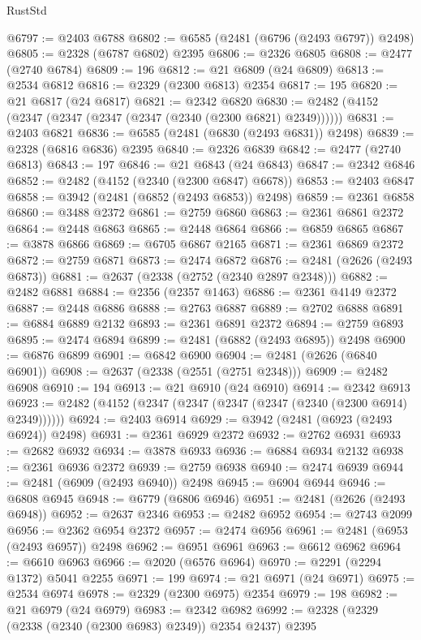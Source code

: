 \begin{lexlean}{RustStd}
\begin{coremodule}
@6797 := @2403 @6788
@6802 := @6585 (@2481 (@6796 (@2493 @6797)) @2498)
@6805 := @2328 (@6787 @6802) @2395
@6806 := @2326 @6805
@6808 := @2477 (@2740 @6784)
@6809 := 196
@6812 := @21 @6809 (@24 @6809)
@6813 := @2534 @6812
@6816 := @2329 (@2300 @6813) @2354
@6817 := 195
@6820 := @21 @6817 (@24 @6817)
@6821 := @2342 @6820
@6830 := @2482 (@4152 (@2347 (@2347 (@2347 (@2347 (@2340 (@2300 @6821) @2349))))))
@6831 := @2403 @6821
@6836 := @6585 (@2481 (@6830 (@2493 @6831)) @2498)
@6839 := @2328 (@6816 @6836) @2395
@6840 := @2326 @6839
@6842 := @2477 (@2740 @6813)
@6843 := 197
@6846 := @21 @6843 (@24 @6843)
@6847 := @2342 @6846
@6852 := @2482 (@4152 (@2340 (@2300 @6847) @6678))
@6853 := @2403 @6847
@6858 := @3942 (@2481 (@6852 (@2493 @6853)) @2498)
@6859 := @2361 @6858
@6860 := @3488 @2372
@6861 := @2759 @6860
@6863 := @2361 @6861 @2372
@6864 := @2448 @6863
@6865 := @2448 @6864
@6866 := @6859 @6865
@6867 := @3878 @6866
@6869 := @6705 @6867 @2165
@6871 := @2361 @6869 @2372
@6872 := @2759 @6871
@6873 := @2474 @6872
@6876 := @2481 (@2626 (@2493 @6873))
@6881 := @2637 (@2338 (@2752 (@2340 @2897 @2348)))
@6882 := @2482 @6881
@6884 := @2356 (@2357 @1463)
@6886 := @2361 @4149 @2372
@6887 := @2448 @6886
@6888 := @2763 @6887
@6889 := @2702 @6888
@6891 := @6884 @6889 @2132
@6893 := @2361 @6891 @2372
@6894 := @2759 @6893
@6895 := @2474 @6894
@6899 := @2481 (@6882 (@2493 @6895)) @2498
@6900 := @6876 @6899
@6901 := @6842 @6900
@6904 := @2481 (@2626 (@6840 @6901))
@6908 := @2637 (@2338 (@2551 (@2751 @2348)))
@6909 := @2482 @6908
@6910 := 194
@6913 := @21 @6910 (@24 @6910)
@6914 := @2342 @6913
@6923 := @2482 (@4152 (@2347 (@2347 (@2347 (@2347 (@2340 (@2300 @6914) @2349))))))
@6924 := @2403 @6914
@6929 := @3942 (@2481 (@6923 (@2493 @6924)) @2498)
@6931 := @2361 @6929 @2372
@6932 := @2762 @6931
@6933 := @2682 @6932
@6934 := @3878 @6933
@6936 := @6884 @6934 @2132
@6938 := @2361 @6936 @2372
@6939 := @2759 @6938
@6940 := @2474 @6939
@6944 := @2481 (@6909 (@2493 @6940)) @2498
@6945 := @6904 @6944
@6946 := @6808 @6945
@6948 := @6779 (@6806 @6946)
@6951 := @2481 (@2626 (@2493 @6948))
@6952 := @2637 @2346
@6953 := @2482 @6952
@6954 := @2743 @2099
@6956 := @2362 @6954 @2372
@6957 := @2474 @6956
@6961 := @2481 (@6953 (@2493 @6957)) @2498
@6962 := @6951 @6961
@6963 := @6612 @6962
@6964 := @6610 @6963
@6966 := @2020 (@6576 @6964)
@6970 := @2291 (@2294 @1372) @5041 @2255
@6971 := 199
@6974 := @21 @6971 (@24 @6971)
@6975 := @2534 @6974
@6978 := @2329 (@2300 @6975) @2354
@6979 := 198
@6982 := @21 @6979 (@24 @6979)
@6983 := @2342 @6982
@6992 := @2328 (@2329 (@2338 (@2340 (@2300 @6983) @2349)) @2354 @2437) @2395

\end{coremodule}
\end{lexlean}
